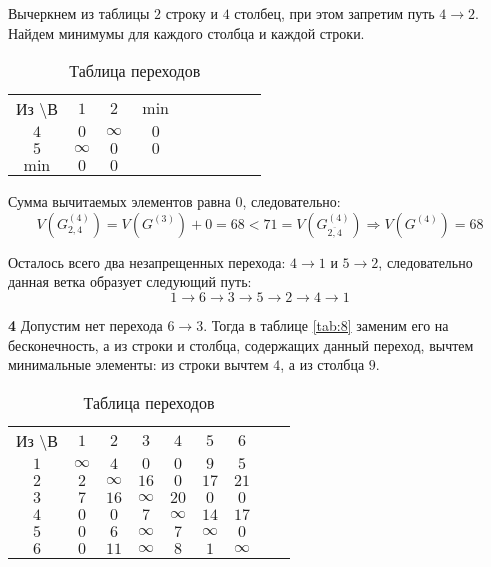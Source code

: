 Вычеркнем из таблицы $2$ строку и $4$ столбец, при этом запретим путь $4 \rightarrow 2$. Найдем минимумы для каждого столбца и каждой строки.

\begin{table}[H]
\begin{center}
	\def\tabcolsep{15pt}
	\caption{Таблица переходов}
	\label{tab:18}
	\begin{tabular}{|c||c|c|c|c|c|c|c|c|}
		\hline
		Из \textbackslash В & $1$ & $2$ & $\min$ \\
		\hhline{|=#=|=|=|=|=|=|}
		$4$ & $0$ & $\infty$ & $0$ \\
		\hline
		$5$ & $\infty$ & $0$ & $0$ \\
		\hhline{|=#=|=|=|=|=|=|} 
		$\min$ & $0$ & $0$ & \\ 
		\hline
	\end{tabular}
\end{center}
\end{table}

Сумма вычитаемых элементов равна $0$, следовательно:
\begin{equation*}
V(G_{2,4}^{(4)}) = V(G^{(3)}) + 0 = 68 < 71 = V(G_{\overline{2,4}}^{(4)}) \Rightarrow V(G^{(4)}) = 68
\end{equation*}

Осталось всего два незапрещенных перехода: $4 \rightarrow 1$ и $5 \rightarrow 2$, следовательно данная ветка образует следующий путь:
\begin{equation*}
1 \rightarrow 6 \rightarrow 3 \rightarrow 5 \rightarrow 2 \rightarrow 4 \rightarrow 1
\end{equation*}

\textbf{4} Допустим нет перехода $6 \rightarrow 3$. Тогда в таблице \ref{tab:8} заменим его на бесконечность, а из строки и столбца, содержащих данный переход, вычтем минимальные элементы: из строки вычтем $4$, а из столбца $9$.

\begin{table}[H]
\begin{center}
	\def\tabcolsep{15pt}
	\caption{Таблица переходов}
	\label{tab:19}
	\begin{tabular}{|c||c|c|c|c|c|c|c|c|}
		\hline
		Из \textbackslash В & $1$ & $2$ & $3$ & $4$ & $5$ & $6$ \\
		\hhline{|=#=|=|=|=|=|=|}
		$1$ & $\infty$ & $4$ & $0$ & $0$ & $9$ & $5$ \\
		\hline
		$2$ & $2$ & $\infty$ & $16$ & $0$ & $17$ & $21$ \\
		\hline
		$3$ & $7$ & $16$ & $\infty$ & $20$ & $0$ & $0$ \\ 
		\hline
		$4$ & $0$ & $0$ & $7$ & $\infty$ & $14$ & $17$ \\
		\hline
		$5$ & $0$ & $6$ & $\infty$ & $7$ & $\infty$ & $0$ \\
		\hline
		$6$ & $0$ & $11$ & $\infty$ & $8$ & $1$ & $\infty$ \\ 
		\hline
	\end{tabular}
\end{center}
\end{table}

